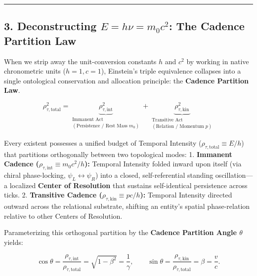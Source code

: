\documentclass[
]{article}
\begin{document}
\begin{center}\rule{0.5\linewidth}{0.5pt}\end{center}

\subsection{\texorpdfstring{3. Deconstructing \(E = h\nu = m_0 c^2\):
The Cadence Partition
Law}{3. Deconstructing E = h\textbackslash nu = m\_0 c\^{}2: The Cadence Partition Law}}\label{deconstructing-e-hnu-m_0-c2-the-cadence-partition-law}

When we strip away the unit-conversion constants \(h\) and \(c^2\) by
working in native chronometric units (\(h = 1, c = 1\)), Einstein's
triple equivalence collapses into a single ontological conservation and
allocation principle: the \textbf{Cadence Partition Law}.

\[\rho_{\tau,\text{total}}^2 = \underbrace{\rho_{\tau,\text{int}}^2}_{\substack{\text{Immanent Act} \\ (\text{Persistence / Rest Mass } m_0)}} + \underbrace{\rho_{\tau,\text{kin}}^2}_{\substack{\text{Transitive Act} \\ (\text{Relation / Momentum } p)}}\]

Every existent possesses a unified budget of Temporal Intensity
(\(\rho_{\tau,\text{total}} \equiv E/h\)) that partitions orthogonally
between two topological modes: 1. \textbf{Immanent Cadence
(\(\rho_{\tau,\text{int}} \equiv m_0 c^2 / h\)):} Temporal Intensity
folded inward upon itself (via chiral phase-locking,
\(\psi_L \leftrightarrow \psi_R\)) into a closed, self-referential
standing oscillation---a localized \textbf{Center of Resolution} that
sustains self-identical persistence across ticks. 2. \textbf{Transitive
Cadence (\(\rho_{\tau,\text{kin}} \equiv pc / h\)):} Temporal Intensity
directed outward across the relational substrate, shifting an entity's
spatial phase-relation relative to other Centers of Resolution.

Parameterizing this orthogonal partition by the \textbf{Cadence
Partition Angle \(\theta\)} yields:

\[\cos\theta = \frac{\rho_{\tau,\text{int}}}{\rho_{\tau,\text{total}}} = \sqrt{1 - \beta^2} = \frac{1}{\gamma}, \qquad \sin\theta = \frac{\rho_{\tau,\text{kin}}}{\rho_{\tau,\text{total}}} = \beta = \frac{v}{c}.\]
\end{document}
